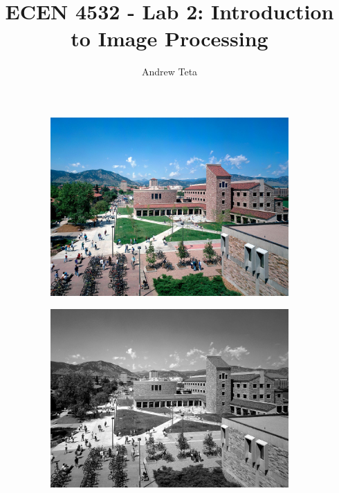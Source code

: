 \documentclass[11pt,a4paper]{article}
\author{Andrew Teta}
\title{ECEN 4532 - Lab 2: Introduction to Image Processing}
\begin{document}
\maketitle

\begin{figure}[ht]
	\centering
	\begin{subfigure}[h]{0.6\textwidth}
		\includegraphics[width=\textwidth]{images/test01}
	\end{subfigure}
	\par\bigskip
	\begin{subfigure}[h]{0.6\textwidth}
		\includegraphics[width=\textwidth]{figs/test01_gray}
	\end{subfigure}
\end{figure}
\end{document}
